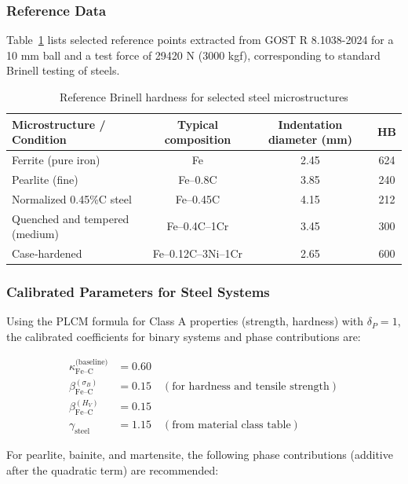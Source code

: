 \documentclass[12pt,a4paper]{article}
\begin{document}
	\subsubsection{Reference Data}
	
	Table~\ref{tab:steel_reference} lists selected reference points extracted from GOST R 8.1038-2024 for a 10 mm ball and a test force of 29420 N (3000 kgf), corresponding to standard Brinell testing of steels.
	
	\begin{table}[htbp]
		\centering
		\caption{Reference Brinell hardness for selected steel microstructures}
		\label{tab:steel_reference}
		\begin{tabular}{lccc}
			\toprule
			\textbf{Microstructure / Condition} & \textbf{Typical composition} & \textbf{Indentation diameter (mm)} & \textbf{HB} \\
			\midrule
			Ferrite (pure iron) & Fe & 2.45 & 624 \\
			Pearlite (fine) & Fe–0.8C & 3.85 & 240 \\
			Normalized 0.45\%C steel & Fe–0.45C & 4.15 & 212 \\
			Quenched and tempered (medium) & Fe–0.4C–1Cr & 3.45 & 300 \\
			Case‑hardened & Fe–0.12C–3Ni–1Cr & 2.65 & 600 \\
			\bottomrule
		\end{tabular}
	\end{table}
	
	\subsubsection{Calibrated Parameters for Steel Systems}
	
	Using the PLCM formula for Class A properties (strength, hardness) with $\delta_P = 1$, the calibrated coefficients for binary systems and phase contributions are:
	
	\begin{align*}
		\kappa_{\text{Fe–C}}^{\text{(baseline)}} &= 0.60 \\
		\beta_{\text{Fe–C}}^{(\sigma_B)} &= 0.15 \quad (\text{for hardness and tensile strength}) \\
		\beta_{\text{Fe–C}}^{(H_V)} &= 0.15 \\
		\gamma_{\text{steel}} &= 1.15 \quad (\text{from material class table})
	\end{align*}
	
	For pearlite, bainite, and martensite, the following phase contributions (additive after the quadratic term) are recommended:
	
\end{document}
